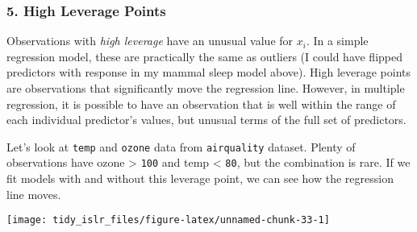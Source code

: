 \documentclass[]{book}
\newenvironment{Shaded}{\begin{snugshade}}{\end{snugshade}}
\newcommand{\DataTypeTok}[1]{\textcolor[rgb]{0.13,0.29,0.53}{#1}}
\newcommand{\DecValTok}[1]{\textcolor[rgb]{0.00,0.00,0.81}{#1}}
\newcommand{\KeywordTok}[1]{\textcolor[rgb]{0.13,0.29,0.53}{\textbf{#1}}}
\newcommand{\NormalTok}[1]{#1}
\newcommand{\OperatorTok}[1]{\textcolor[rgb]{0.81,0.36,0.00}{\textbf{#1}}}
\newcommand{\StringTok}[1]{\textcolor[rgb]{0.31,0.60,0.02}{#1}}
\begin{document}
\hypertarget{high-leverage-points}{%
\subsubsection{5. High Leverage Points}\label{high-leverage-points}}

Observations with \emph{high leverage} have an unusual value for \(x_i\). In a simple regression model, these are practically the same as outliers (I could have flipped predictors with response in my mammal sleep model above). High leverage points are observations that significantly move the regression line. However, in multiple regression, it is possible to have an observation that is well within the range of each individual predictor's values, but unusual terms of the full set of predictors.

Let's look at \texttt{temp} and \texttt{ozone} data from \texttt{airquality} dataset. Plenty of observations have ozone \textgreater{} \texttt{100} and temp \textless{} \texttt{80}, but the combination is rare. If we fit models with and without this leverage point, we can see how the regression line moves.

\begin{Shaded}
\end{Shaded}

\begin{center}\texttt{[image: tidy\_islr\_files/figure-latex/unnamed-chunk-33-1]} \end{center}

\begin{Shaded}
\end{Shaded}
\end{document}
